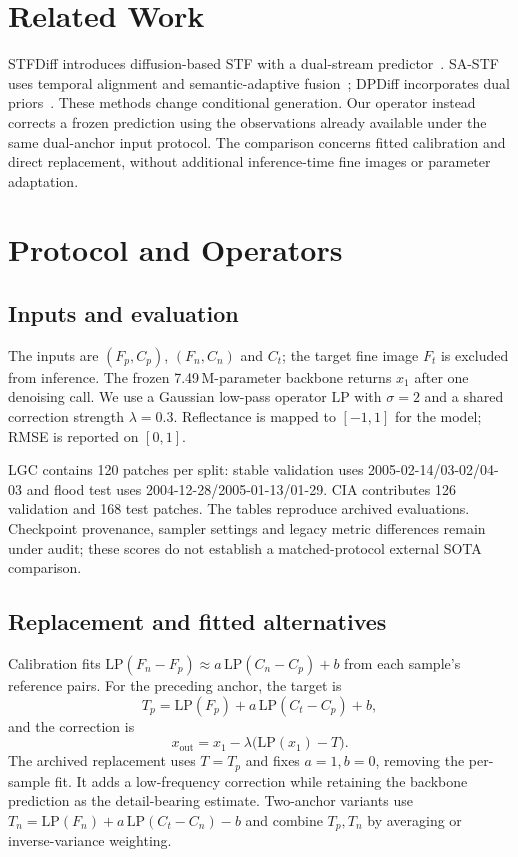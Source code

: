 \documentclass{article}
\begin{document}
\section{Related Work}
\label{sec:related}
STFDiff introduces diffusion-based STF with a dual-stream predictor~\cite{huang2024stfdiff}.
SA-STF uses temporal alignment and semantic-adaptive fusion~\cite{zhang2026sastf}; DPDiff incorporates dual priors~\cite{zhu2026dpdiff}.
These methods change conditional generation.
Our operator instead corrects a frozen prediction using the observations already available under the same dual-anchor input protocol.
The comparison concerns fitted calibration and direct replacement, without additional inference-time fine images or parameter adaptation.

\section{Protocol and Operators}
\label{sec:method}
\subsection{Inputs and evaluation}
The inputs are $(F_p,C_p)$, $(F_n,C_n)$ and $C_t$; the target fine image $F_t$ is excluded from inference.
The frozen 7.49\,M-parameter backbone returns $x_1$ after one denoising call.
We use a Gaussian low-pass operator $\mathrm{LP}$ with $\sigma=2$ and a shared correction strength $\lambda=0.3$.
Reflectance is mapped to $[-1,1]$ for the model; RMSE is reported on $[0,1]$.

LGC contains 120 patches per split: stable validation uses 2005-02-14/03-02/04-03 and flood test uses 2004-12-28/2005-01-13/01-29.
CIA contributes 126 validation and 168 test patches.
The tables reproduce archived evaluations.
Checkpoint provenance, sampler settings and legacy metric differences remain under audit; these scores do not establish a matched-protocol external SOTA comparison.

\subsection{Replacement and fitted alternatives}
Calibration fits $\mathrm{LP}(F_n-F_p)\approx a\,\mathrm{LP}(C_n-C_p)+b$ from each sample's reference pairs.
For the preceding anchor, the target is
\begin{equation}
T_p=\mathrm{LP}(F_p)+a\,\mathrm{LP}(C_t-C_p)+b,
\label{eq:target}
\end{equation}
and the correction is
\begin{equation}
x_{\mathrm{out}}=x_1-\lambda\bigl(\mathrm{LP}(x_1)-T\bigr).
\label{eq:proj}
\end{equation}
The archived replacement uses $T=T_p$ and fixes $a=1,b=0$, removing the per-sample fit.
It adds a low-frequency correction while retaining the backbone prediction as the detail-bearing estimate.
Two-anchor variants use $T_n=\mathrm{LP}(F_n)+a\,\mathrm{LP}(C_t-C_n)-b$ and combine $T_p,T_n$ by averaging or inverse-variance weighting.
\end{document}
